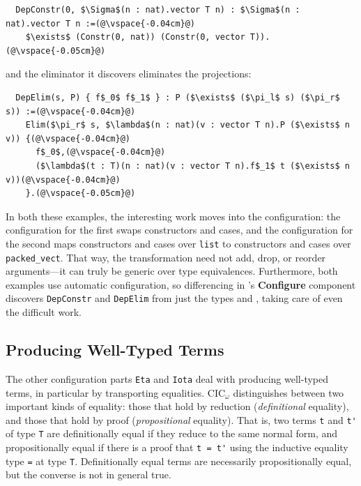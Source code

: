 \begin{lstlisting}
  DepConstr(0, $\Sigma$(n : nat).vector T n) : $\Sigma$(n : nat).vector T n :=(@\vspace{-0.04cm}@)
    $\exists$ (Constr(0, nat)) (Constr(0, vector T)).(@\vspace{-0.05cm}@)
\end{lstlisting}
and the eliminator it discovers eliminates the projections:

\begin{lstlisting}
  DepElim(s, P) { f$_0$ f$_1$ } : P ($\exists$ ($\pi_l$ s) ($\pi_r$ s)) :=(@\vspace{-0.04cm}@)
    Elim($\pi_r$ s, $\lambda$(n : nat)(v : vector T n).P ($\exists$ n v)) {(@\vspace{-0.04cm}@)
      f$_0$,(@\vspace{-0.04cm}@)
      ($\lambda$(t : T)(n : nat)(v : vector T n).f$_1$ t ($\exists$ n v))(@\vspace{-0.04cm}@)
    }.(@\vspace{-0.05cm}@) 
\end{lstlisting}

In both these examples, the interesting work moves into the configuration:
the configuration for the first swaps constructors and cases,
and the configuration for the second maps constructors and cases over \lstinline{list} to constructors and cases over \lstinline{packed_vect}. %
That way, the transformation need not add, drop, or reorder arguments---it can truly be generic over type equivalences.
Furthermore, both examples use automatic configuration, so differencing in \toolnamec's \textbf{Configure} component
discovers \lstinline{DepConstr} and \lstinline{DepElim} from just the types \Aa and \B, taking care of even the difficult work.

\subsection{Producing Well-Typed Terms}
\label{sec:pi-diff-equal}

The other configuration parts \lstinline{Eta} and \lstinline{Iota} deal with producing well-typed terms,
in particular by transporting equalities.
CIC$_{\omega}$ distinguishes between two important kinds of equality: those that hold by reduction (\textit{definitional} equality), and those that hold by proof (\textit{propositional} equality).
That is, two terms \lstinline{t} and \lstinline{t'} of type \lstinline{T} are definitionally equal if they reduce to the same normal form,
and propositionally equal if there is a proof that \lstinline{t = t'} using the inductive
equality type \lstinline{=} at type \lstinline{T}. Definitionally equal terms are necessarily propositionally equal, but 
the converse is not in general true. %

